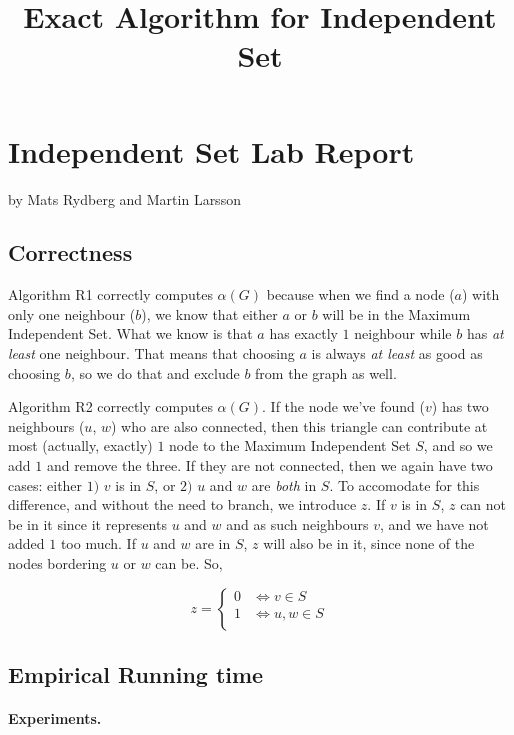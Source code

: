 \documentclass{tufte-handout}
\title{\sf Exact Algorithm for Independent Set}
\author{}
\begin{document}
\maketitle

\section{Independent Set Lab Report}


by Mats Rydberg and Martin Larsson

\subsection{Correctness}
Algorithm R1 correctly computes $\alpha(G)$ because when we find a node ($a$) with only one neighbour ($b$), we know that either $a$ or $b$ will be in the Maximum Independent Set. What we know is that $a$ has exactly $1$ neighbour while $b$ has \emph{at least} one neighbour. That means that choosing $a$ is always \emph{at least} as good as choosing $b$, so we do that and exclude $b$ from the graph as well.

\noindent
Algorithm R2 correctly computes $\alpha(G)$. If the node we've found ($v$) has two neighbours ($u$, $w$) who are also connected, then this triangle can contribute at most (actually, exactly) $1$ node to the Maximum Independent Set $S$, and so we add $1$ and remove the three. If they are not connected, then we again have two cases: either $1)$ $v$ is in $S$, or $2)$ $u$ and $w$ are \emph{both} in $S$. To accomodate for this difference, and without the need to branch, we introduce $z$. If $v$ is in $S$, $z$ can not be in it since it represents $u$ and $w$ and as such neighbours $v$, and we have not added $1$ too much. If $u$ and $w$ are in $S$, $z$ will also be in it, since none of the nodes bordering $u$ or $w$ can be. So,

$$z = \left\{ \begin{array}{ll}
0 & \Leftrightarrow v \in S \\
1 & \Leftrightarrow u,w \in S \\
\end{array}
\right. $$

\subsection{Empirical Running time}

\paragraph{Experiments.}
\end{document}
